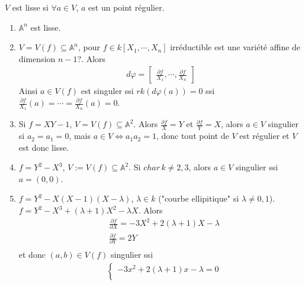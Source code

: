             \begin{defi}
                $V$ est lisse si $\forall a \in V$, $a$ est un point régulier.
            \end{defi}
            \begin{expl}
                \begin{enumerate}
                    \item $\mathbb{A}^n$ est lisse.
                    \item $V = V(f) \subseteq \mathbb{A}^n$, pour $f \in k[X_1, \cdots, X_n]$ irréductible est une variété affine de dimension $n-1$?. Alors
                    \begin{align*}
                        d \varphi =
                        \begin{bmatrix}
                            \frac{\partial f}{X_1}, \cdots, \frac{\partial f}{X_n}
                        \end{bmatrix}
                    \end{align*}
                    Ainsi $a \in V(f)$ est singuler ssi $rk (d \varphi(a)) = 0$ ssi $\frac{\partial f}{X_1}(a) = \cdots = \frac{\partial f}{X_n}(a) = 0$.
                    \item Si $f = XY - 1$, $V = V(f) \subseteq \mathbb{A}^2$. Alors $\frac{\partial f}{X} = Y$ et $\frac{\partial f}{Y} = X$, alors $a \in V$ singulier si $a_2 = a_1 = 0$, mais $a \in V \iff a_1a_2 = 1$, donc tout point de $V$ est régulier et $V$ est donc lisse.
                    \item $f = Y^2 - X^3$, $V := V(f) \subseteq \mathbb{A}^2$. Si $char \, k \neq 2,3$, alors $a \in V$ singulier ssi $a = (0,0)$. 
                    \item $f = Y^2 - X(X-1)(X - \lambda)$, $\lambda \in k$ ("courbe ellipitique" si $\lambda \neq 0,1$). $f = Y^2 - X^3 + (\lambda + 1)X^2 - \lambda X$. Alors
                    \begin{align*}
                        & \frac{\partial f}{\partial X} = -3X^2 + 2(\lambda + 1)X - \lambda \\
                        & \frac{\partial f}{\partial Y} = 2Y \\
                    \end{align*}
                    et donc $(a,b) \in V(f)$ singulier ssi
                    \begin{align*}
                        &\begin{cases}
                        -3x^2 + 2(\lambda + 1)x - \lambda = 0 \\

\end{cases}
\end{align*}
\end{enumerate}
\end{expl}
